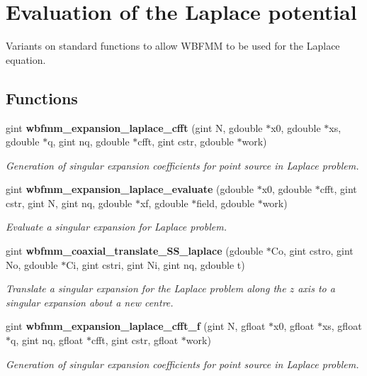 \section{Evaluation of the Laplace potential}
\label{group__laplace}


Variants on standard functions to allow W\+B\+F\+M\+M to be used for the Laplace equation.  


\subsection*{Functions}
\begin{DoxyCompactItemize}
\item 
gint {\bf wbfmm\+\_\+expansion\+\_\+laplace\+\_\+cfft} (gint N, gdouble $\ast$x0, gdouble $\ast$xs, gdouble $\ast$q, gint nq, gdouble $\ast$cfft, gint cstr, gdouble $\ast$work)
\begin{DoxyCompactList}\small\item\em Generation of singular expansion coefficients for point source in Laplace problem. \end{DoxyCompactList}\item 
gint {\bf wbfmm\+\_\+expansion\+\_\+laplace\+\_\+evaluate} (gdouble $\ast$x0, gdouble $\ast$cfft, gint cstr, gint N, gint nq, gdouble $\ast$xf, gdouble $\ast$field, gdouble $\ast$work)
\begin{DoxyCompactList}\small\item\em Evaluate a singular expansion for Laplace problem. \end{DoxyCompactList}\item 
gint {\bf wbfmm\+\_\+coaxial\+\_\+translate\+\_\+\+S\+S\+\_\+laplace} (gdouble $\ast$Co, gint cstro, gint No, gdouble $\ast$Ci, gint cstri, gint Ni, gint nq, gdouble t)
\begin{DoxyCompactList}\small\item\em Translate a singular expansion for the Laplace problem along the $z$ axis to a singular expansion about a new centre. \end{DoxyCompactList}\item 
gint {\bf wbfmm\+\_\+expansion\+\_\+laplace\+\_\+cfft\+\_\+f} (gint N, gfloat $\ast$x0, gfloat $\ast$xs, gfloat $\ast$q, gint nq, gfloat $\ast$cfft, gint cstr, gfloat $\ast$work)
\begin{DoxyCompactList}\small\item\em Generation of singular expansion coefficients for point source in Laplace problem. \end{DoxyCompactList}\item 

\end{DoxyCompactItemize}
